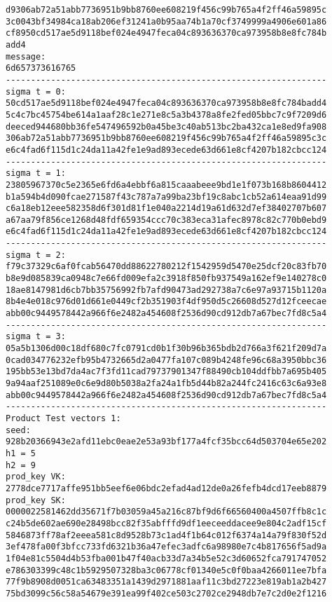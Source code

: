 \documentclass{article}
\begin{document}
{\begin{verbatim}
d9306ab72a51abb7736951b9bb8760ee608219f456c99b765a4f2ff46a59895c
3c0043bf34984ca18ab206ef31241a0b95aa74b1a70cf3749999a4906e601a86
cf8950cd517ae5d9118bef024e4947feca04c893636370ca973958b8e8fc784b
add4
message:
6d657373616765
----------------------------------------------------------------
sigma t = 0:
50cd517ae5d9118bef024e4947feca04c893636370ca973958b8e8fc784badd4
5c4c7bc45754be614a1aaf28c1e271e8c5a3b4378a8fe2fed05bbc7c9f7209d6
deeced944680bb36fe547496592b0a45be3c40ab513bc2ba432ca1e8ed9fa908
306ab72a51abb7736951b9bb8760ee608219f456c99b765a4f2ff46a59895c3c
e6c4fad6f115d1c24da11a42fe1e9ad893ecede63d661e8cf4207b182cbcc124
----------------------------------------------------------------
sigma t = 1:
23805967370c5e2365e6fd6a4ebbf6a815caaabeee9bd1e1f073b168b8604412
b1a594b4d090fcae271587f43c787a7a99ba23bf19c8abc1cb52a614eaa91d99
c6a18eb12eee582358d6f301d81f1e040a2214d19a61d632d7ef38402707b607
a67aa79f856ce1268d48fdf659354ccc70c383eca31afec8978c82c770b0ebd9
e6c4fad6f115d1c24da11a42fe1e9ad893ecede63d661e8cf4207b182cbcc124
----------------------------------------------------------------
sigma t = 2:
f79c37329c6af0fcab56470dd88622780212f1542959d5470e25dcf20c83fb70
b8e9d085839ca0948c7e66fd009efa2c3918f850fb937549a162ef9e140278c0
18ae8147981d6cb7bb35756992fb7afd90473ad292738a7c6e97a93715b1120a
8b4e4e018c976d01d661e0449cf2b351903f4df950d5c26608d527d12fceecae
abb00c9449578442a966f6e2482a454608f2536d90cd912db7a67bec7fd8c5a4
----------------------------------------------------------------
sigma t = 3:
05a5b1306d00c18df680c7fc0791cd0b1f30b96b365bdb2d766a3f621f209d7a
0cad034776232efb95b4732665d2a0477fa107c089b4248fe96c68a3950bbc36
195bb53e13bd7da4ac7f3fd11cad79737901347f88490cb104ddfbb7a695b405
9a94aaf251089e0c6e9d80b5038a2fa24a1fb5d44b82a244fc2416c63c6a93e8
abb00c9449578442a966f6e2482a454608f2536d90cd912db7a67bec7fd8c5a4
----------------------------------------------------------------
Product Test vectors 1:
seed:
928b20366943e2afd11ebc0eae2e53a93bf177a4fcf35bcc64d503704e65e202
h1 = 5
h2 = 9
prod_key VK:
2778dce7717affe951bb5eef6e06bdc2efad4ad12de0a26fefb4dcd17eeb8879
prod_key SK:
0000022581462dd35671f7b03059a45a216c87bf9d6f66560400a4507ffb8c1c
c24b5de602ae690e28498bcc82f35abfffd9df1eeceeddacee9e804c2adf15cf
5846873ff78af2eeea581c8d9528b73c1ad4f1b64c012f6374a14a79f830f52d
3ef478fa00f3bfcc733fd6321b36a47efec3adfc6a98980e7c4b817656f5ad9a
1f04e81c5504d4b53fba001b47f40acb33d7a34b5e52c3d60652fca791747052
e786303399c48c1b5929507328ba3c06778cf01340e5c0f0baa4266011ee7bfa
77f9b8908d0051ca63483351a1439d2971881aaf11c3bd27223e819ab1a2b427
75bd3099c56c58a54679e391ea99f402ce503c2702ce2948db7e7c2d0e2f1216

\end{verbatim}}
\end{document}
